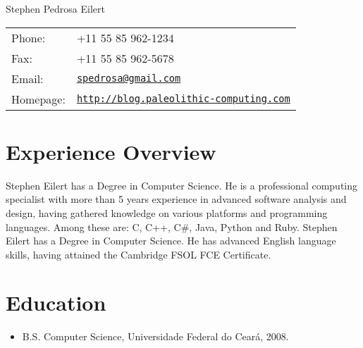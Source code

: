 \documentclass[letterpaper]{article}
\def\name{Stephen Pedrosa Eilert}
\begin{document}
\begin{flushright}

{\huge \name}


\vspace{0.25in}
\begin{minipage}{0.45\linewidth}
  \begin{tabular}{ll}
    Phone: & +11 55 85 962-1234 \\
    Fax: &  +11 55 85 962-5678 \\
    Email: & \href{mailto:spedrosa@gmail.com}{\tt spedrosa@gmail.com} \\
    Homepage: & \href{http://blog.paleolithic-computing.com}{\tt http://blog.paleolithic-computing.com} \\
  \end{tabular}
\end{minipage}
\end{flushright}
\section*{Experience Overview}

Stephen Eilert has a Degree in Computer Science. He is a professional computing
specialist with more than 5 years experience in advanced software analysis and design,
having gathered knowledge on various platforms and programming languages. Among these
are: C, C++, C\#, Java, Python and Ruby.
Stephen Eilert has a Degree in Computer Science.
He has advanced English language skills, having attained the Cambridge FSOL FCE
Certificate.


\section*{Education}

\begin{itemize}
  \item B.S. Computer Science, Universidade Federal do Ceará, 2008.
\end{itemize}
\end{document}

